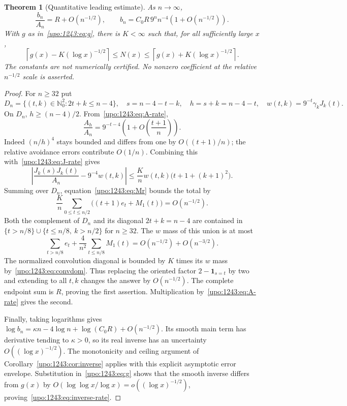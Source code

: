 \documentclass[11pt,letterpaper]{article}
\newtheorem{theorem}{Theorem}[section]
\theoremstyle{remark}\newtheorem{remark}[theorem]{Remark}
\numberwithin{equation}{section}
\newcommand{\N}{\mathbb N_0}
\begin{document}
\begin{theorem}[Quantitative leading estimate]\label{upo:1243:thm:rate}
As $n\to\infty$,
\begin{equation}\label{upo:1243:eq:count-rate}
 \frac{b_n}{A_n}=R+O(n^{-1/2}),\qquad
 b_n=C_0R\,9^n n^{-4}(1+O(n^{-1/2})).
\end{equation}
With $g$ as in~\eqref{upo:1243:eq:g}, there is $K<\infty$ such that, for all
sufficiently large $x$,
\begin{equation}\label{upo:1243:eq:inverse-rate}
 \left\lceil g(x)-K(\log x)^{-1/2}\right\rceil
 \le N(x)\le
 \left\lceil g(x)+K(\log x)^{-1/2}\right\rceil.
\end{equation}
The constants are not numerically certified. No nonzero coefficient at
the relative $n^{-1/2}$ scale is asserted.
\end{theorem}
\begin{proof}
For $n\ge32$ put
\[
 D_n=\{(t,k)\in\N^2:2t+k\le n-4\},\quad
 s=n-4-t-k,\quad h=s+k=n-4-t,\quad
 w(t,k)=9^{-t}\gamma_kJ_k(t).
\]
On $D_n$, $h\ge(n-4)/2$. From~\eqref{upo:1243:eq:A-rate},
\[
 \frac{A_h}{A_n}=9^{-t-4}\left(1+O\left(\frac{t+1}{n}\right)\right).
\]
Indeed $(n/h)^4$ stays bounded and differs from one by $O((t+1)/n)$;
the relative avoidance errors contribute $O(1/n)$.
Combining this with~\eqref{upo:1243:eq:J-rate} gives
\[
 \left|\frac{J_k(s)J_k(t)}{A_n}-9^{-4}w(t,k)\right|
 \le\frac K n w(t,k)\bigl(t+1+(k+1)^2\bigr).
\]
Summing over $D_n$, equation~\eqref{upo:1243:eq:Mr} bounds the total by
\[
 \frac K n\sum_{0\le t\le n/2}
       \bigl((t+1)e_t+M_1(t)\bigr)=O(n^{-1/2}).
\]
Both the complement of $D_n$ and its diagonal $2t+k=n-4$ are contained
in
$\{t>n/8\}\cup\{t\le n/8,\ k>n/2\}$ for $n\ge32$.
The $w$ mass of this union is at most
\[
 \sum_{t>n/8}e_t+\frac4{n^2}\sum_{t\le n/8}M_1(t)
 =O(n^{-1/2})+O(n^{-3/2}).
\]
The normalized convolution diagonal is bounded by $K$ times its $w$
mass by~\eqref{upo:1243:eq:convdom}. Thus replacing the oriented factor
$2-\mathbf1_{s=t}$ by two and extending to all $t,k$ changes the answer
by $O(n^{-1/2})$. The complete endpoint sum is $R$, proving the first
assertion. Multiplication by~\eqref{upo:1243:eq:A-rate} gives the second.

Finally, taking logarithms gives
$\log b_n=\kappa n-4\log n+\log(C_0R)+O(n^{-1/2})$.
Its smooth main term has derivative tending to $\kappa>0$, so its real
inverse has an uncertainty $O((\log x)^{-1/2})$. The monotonicity and
ceiling argument of Corollary~\ref{upo:1243:cor:inverse} applies with this explicit
asymptotic error envelope. Substitution in~\eqref{upo:1243:eq:g} shows that the
smooth inverse differs from $g(x)$ by
$O(\log\log x/\log x)=o((\log x)^{-1/2})$, proving~\eqref{upo:1243:eq:inverse-rate}.
\end{proof}
\end{document}

